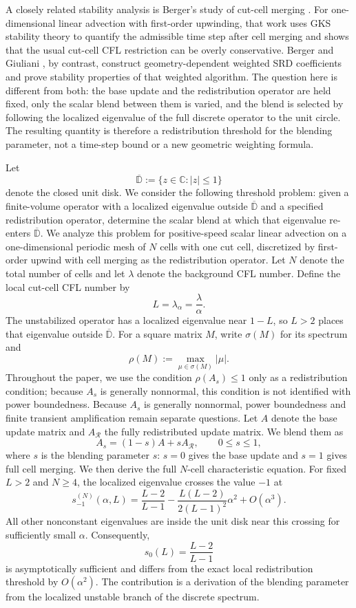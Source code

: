 \documentclass[preprint,12pt]{elsarticle}
\begin{document}
A closely related stability analysis is Berger's study of cut-cell merging
\cite{Berger2015}.  For one-dimensional linear advection with first-order
upwinding, that work uses GKS stability theory to quantify the admissible time
step after cell merging and shows that the usual cut-cell CFL restriction can
be overly conservative.  Berger and Giuliani \cite{BergerGiuliani2024}, by
contrast, construct geometry-dependent weighted SRD coefficients and prove
stability properties of that weighted algorithm.  The question here is
different from both: the base update and the redistribution operator are held
fixed, only the scalar blend between them is varied, and the blend is selected
by following the localized eigenvalue of the full discrete operator to the
unit circle.  The resulting quantity is therefore a redistribution threshold for the blending parameter, not a time-step bound or a new geometric weighting
formula.

Let
\[
    \overline{\mathbb D}:=\{z\in\mathbb C:|z|\le1\}
\]
denote the closed unit disk.  We consider the following threshold problem:
given a finite-volume operator with a localized eigenvalue outside
$\overline{\mathbb D}$ and a specified redistribution operator, determine the
scalar blend at which that eigenvalue re-enters $\overline{\mathbb D}$.  We
analyze this problem for positive-speed scalar
linear advection on a one-dimensional periodic mesh of $N$ cells with one cut
cell, discretized by first-order upwind with cell merging as the redistribution operator.  Let
$N$ denote the total number of cells and let $\lambda$ denote the background
CFL number.  Define the local cut-cell CFL number by
\[
    L=\lambda_\alpha=\frac{\lambda}{\alpha}.
\]  The unstabilized operator has a localized
eigenvalue near $1-L$, so $L>2$ places that eigenvalue outside
$\overline{\mathbb D}$.  For a square matrix $M$, write $\sigma(M)$ for its
spectrum and
\[
    \rho(M):=\max_{\mu\in\sigma(M)}|\mu|.
\]
Throughout the paper, we use the condition $\rho(A_s)\le1$ only as a redistribution condition; because $A_s$ is generally nonnormal, this condition is not identified with power boundedness.
Because $A_s$ is generally nonnormal, power boundedness and finite transient
amplification remain separate questions.  Let $A$ denote the base update matrix and
$A_{\mathcal R}$ the fully redistributed update matrix.  We blend them as
\[
    A_s=(1-s)A+sA_{\mathcal R},\qquad 0\le s\le1,
\]
where $s$ is the blending parameter $s$: $s=0$ gives the base update and
$s=1$ gives full cell merging.  We then derive the full $N$-cell
characteristic equation.  For fixed $L>2$ and
$N\ge4$, the localized eigenvalue crosses the value $-1$ at
\[
 s_{-1}^{(N)}(\alpha,L)
 =
 \frac{L-2}{L-1}
 -
 \frac{L(L-2)}{2(L-1)^2}\alpha^2
 +O(\alpha^3).
\]
All other nonconstant eigenvalues are inside the unit disk near this crossing
for sufficiently small $\alpha$.  Consequently,
\[
    s_0(L)=\frac{L-2}{L-1}
\]
is asymptotically sufficient and differs from the exact local redistribution
threshold by $O(\alpha^2)$.  The contribution is a derivation of the
blending parameter from the localized unstable branch of the discrete
spectrum.
\end{document}
